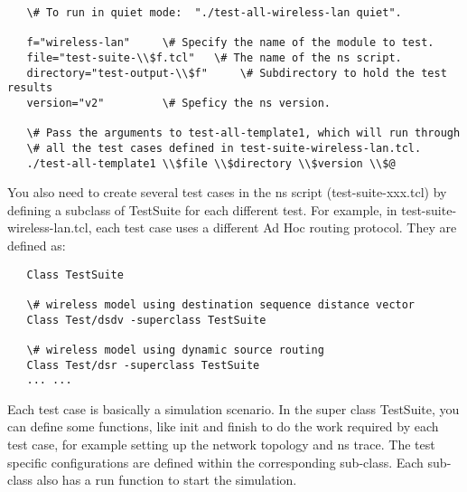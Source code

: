 \begin{verbatim}
   \# To run in quiet mode:  "./test-all-wireless-lan quiet".

   f="wireless-lan"		\# Specify the name of the module to test.
   file="test-suite-\\$f.tcl"	\# The name of the ns script.
   directory="test-output-\\$f" 	\# Subdirectory to hold the test results
   version="v2"			\# Speficy the ns version.
   
   \# Pass the arguments to test-all-template1, which will run through
   \# all the test cases defined in test-suite-wireless-lan.tcl.
   ./test-all-template1 \\$file \\$directory \\$version \\$@
\end{verbatim}


You also need to create several test cases in the ns script (test-suite-xxx.tcl)
by defining a subclass of TestSuite for each different test. For example, in 
test-suite-wireless-lan.tcl, each test case uses a different Ad Hoc routing 
protocol. They are defined as:

\begin{verbatim}	
   Class TestSuite

   \# wireless model using destination sequence distance vector
   Class Test/dsdv -superclass TestSuite

   \# wireless model using dynamic source routing
   Class Test/dsr -superclass TestSuite
   ... ...

\end{verbatim}


Each test case is basically a simulation scenario. In the super class 
TestSuite, you can define some functions, like init and finish to do the work 
required by each test case, for example setting up the network topology and ns
trace. The test specific configurations are defined within the corresponding 
sub-class. Each sub-class also has a run function to start the simulation.

